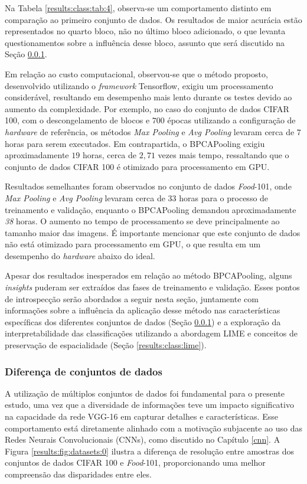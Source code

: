 Na Tabela \ref{results:class:tab:4}, observa-se um comportamento distinto em comparação ao primeiro conjunto de dados. Os resultados de maior acurácia estão representados no quarto bloco, não no último bloco adicionado, o que levanta questionamentos sobre a influência desse bloco, assunto que será discutido na Seção \ref{results:class:datasets}.

Em relação ao custo computacional, observou-se que o método proposto, desenvolvido utilizando o \textit{framework} Tensorflow, exigiu um processamento considerável, resultando em desempenho mais lento durante os testes devido ao aumento da complexidade. Por exemplo, no caso do conjunto de dados CIFAR 100, com o descongelamento de blocos e $700$ épocas utilizando a configuração de \textit{hardware} de referência, os métodos \textit{Max Pooling} e \textit{Avg Pooling} levaram cerca de $7$ horas para serem executados. Em contrapartida, o BPCAPooling exigiu aproximadamente $19$ horas, cerca de $2,71$ vezes mais tempo, ressaltando que o conjunto de dados CIFAR 100 é otimizado para processamento em GPU.

Resultados semelhantes foram observados no conjunto de dados \textit{Food}-101, onde \textit{Max Pooling} e \textit{Avg Pooling} levaram cerca de $33$ horas para o processo de treinamento e validação, enquanto o BPCAPooling demandou aproximadamente \textit{38} horas. O aumento no tempo de processamento se deve principalmente ao tamanho maior das imagens. É importante mencionar que este conjunto de dados não está otimizado para processamento em GPU, o que resulta em um desempenho do \textit{hardware} abaixo do ideal.

Apesar dos resultados inesperados em relação ao método BPCAPooling, alguns \textit{insights} puderam ser extraídos das fases de treinamento e validação. Esses pontos de introspecção serão abordados a seguir nesta seção, juntamente com informações sobre a influência da aplicação desse método nas características específicas dos diferentes conjuntos de dados (Seção \ref{results:class:datasets}) e a exploração da interpretabilidade das classificações utilizando a abordagem LIME e conceitos de preservação de espacialidade (Seção \ref{results:class:lime}).


\subsubsection{Diferença de conjuntos de dados}
\label{results:class:datasets}
A utilização de múltiplos conjuntos de dados foi fundamental para o presente estudo, uma vez que a diversidade de informações teve um impacto significativo na capacidade da rede VGG-16 em capturar detalhes e características. Esse comportamento está diretamente alinhado com a motivação subjacente ao uso das Redes Neurais Convolucionais (CNNs), como discutido no Capítulo \ref{cnn}. A Figura \ref{results:fig:datasets:0} ilustra a diferença de resolução entre amostras dos conjuntos de dados CIFAR 100 e \textit{Food}-101, proporcionando uma melhor compreensão das disparidades entre eles.

